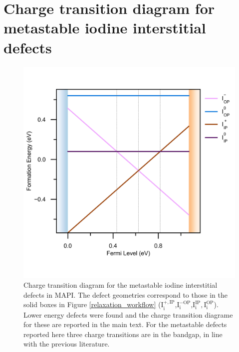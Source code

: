\chapter{\label{app:7-chargetransition}Charge transition diagram for metastable iodine interstitial defects}

\begin{figure}[h!]   %
\centering
  \includegraphics[width=0.7\columnwidth]{figures/ap7/charge_transition_HSE_meta.png}
  \caption[Charge transition diagram for metastable iodine interstitial defects in MAPI]{Charge transition diagram for the metastable iodine interstitial defects in MAPI. The defect geometries correspond to those in the solid boxes in Figure \ref{relaxation_workflow} ($\mathrm{I}_\mathrm{i}^{+,\mathrm{IP}}$,$\mathrm{I}_\mathrm{i}^{-\mathrm{OP}}$,$\mathrm{I}_\mathrm{i}^\mathrm{IP}, \mathrm{I}_\mathrm{i}^\mathrm{OP}$). Lower energy defects were found and the charge transition diagrame for these are reported in the main text. For the metastable defects reported here three charge transitions are in the bandgap, in line with the previous literature.\autocite{Du2015,Meggiolaro2018}}
\label{charge_transition_meta}
\end{figure}